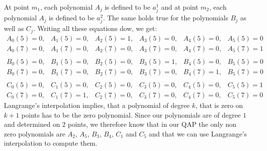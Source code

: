 \begin{example}
At point $m_1$, each polynomial $A_j$ is defined to be $a_j^1$ and at point $m_2$, each polynomial $A_j$ is defined to be $a_j^2$. The same holds true for the polynomials $B_j$ as well as $C_j$. Writing all these equations dow, we get:
$$
\begin{array}{llllll}
A_0(5)=0, & A_1(5)=0, & A_2(5)=1, & A_3(5)=0, & A_4(5)=0, & A_5(5)=0 \\
A_0(7)=0, & A_1(7)=0, & A_2(7)=0, & A_3(7)=0, & A_4(7)=0, & A_5(7)=1\\
\\
B_0(5)=0, & B_1(5)=0, & B_2(5)=0, & B_3(5)=1, & B_4(5)=0, & B_5(5)=0 \\
B_0(7)=0, & B_1(7)=0, & B_2(7)=0, & B_3(7)=0, & B_4(7)=1, & B_5(7)=0\\
\\
C_0(5)=0, & C_1(5)=0, & C_2(5)=0, & C_3(5)=0, & C_4(5)=0, & C_5(5)=1 \\
C_0(7)=0, & C_1(7)=1, & C_2(7)=0, & C_3(7)=0, & C_4(7)=0, & C_5(7)=0
\end{array}
$$
Langrange's interpolation implies, that a polynomial of degree $k$, that is zero on $k+1$ points has to be the zero polynomial. Since our polynomials are of degree $1$ and determined on $2$ points, we therefore know that in our QAP the only non zero polynomials are $A_2$, $A_5$, $B_3$, $B_4$, $C_1$ and $C_5$ and that we can use Langrange's interpolation to compute them. 


\end{example}
